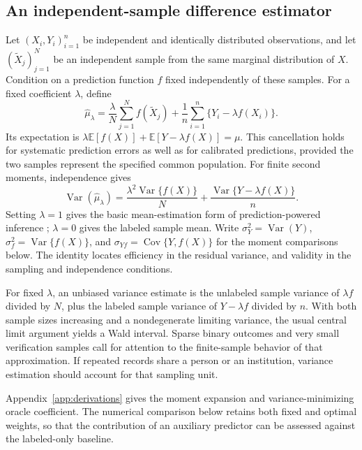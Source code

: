 \documentclass[11pt,a4paper]{article}
\newcommand{\E}{\mathbb{E}}
\newcommand{\Var}{\operatorname{Var}}
\newcommand{\Cov}{\operatorname{Cov}}
\begin{document}
\subsection{An independent-sample difference estimator}

Let $(X_i,Y_i)_{i=1}^{n}$ be independent and identically distributed observations, and let $(\widetilde X_j)_{j=1}^{N}$ be an independent sample from the same marginal distribution of $X$. Condition on a prediction function $f$ fixed independently of these samples. For a fixed coefficient $\lambda$, define
\begin{equation}
 \widehat\mu_\lambda=
 \frac{\lambda}{N}\sum_{j=1}^{N}f(\widetilde X_j)
 +\frac{1}{n}\sum_{i=1}^{n}\{Y_i-\lambda f(X_i)\}.
 \label{eq:ppi}
\end{equation}
Its expectation is $\lambda\E[f(X)]+\E[Y-\lambda f(X)]=\mu$. This cancellation holds for systematic prediction errors as well as for calibrated predictions, provided the two samples represent the specified common population. For finite second moments, independence gives
\begin{equation}
 \Var(\widehat\mu_\lambda)
 =\frac{\lambda^2\Var\{f(X)\}}{N}
  +\frac{\Var\{Y-\lambda f(X)\}}{n}.
 \label{eq:variance-sampling}
\end{equation}
Setting $\lambda=1$ gives the basic mean-estimation form of prediction-powered inference \citep{ppi2023}; $\lambda=0$ gives the labeled sample mean. Write $\sigma_Y^2=\Var(Y)$, $\sigma_f^2=\Var\{f(X)\}$, and $\sigma_{Yf}=\Cov\{Y,f(X)\}$ for the moment comparisons below. The identity locates efficiency in the residual variance, and validity in the sampling and independence conditions.

For fixed $\lambda$, an unbiased variance estimate is the unlabeled sample variance of $\lambda f$ divided by $N$, plus the labeled sample variance of $Y-\lambda f$ divided by $n$. With both sample sizes increasing and a nondegenerate limiting variance, the usual central limit argument yields a Wald interval. Sparse binary outcomes and very small verification samples call for attention to the finite-sample behavior of that approximation. If repeated records share a person or an institution, variance estimation should account for that sampling unit.

Appendix~\ref{app:derivations} gives the moment expansion and variance-minimizing oracle coefficient. The numerical comparison below retains both fixed and optimal weights, so that the contribution of an auxiliary predictor can be assessed against the labeled-only baseline.
\end{document}
